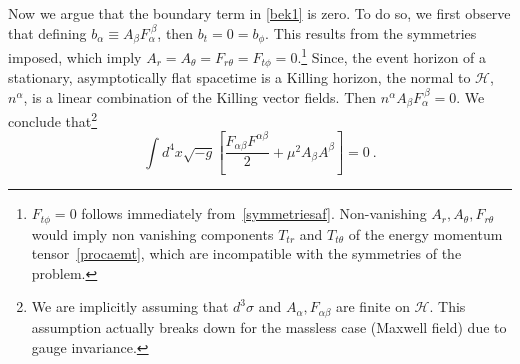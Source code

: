 Now we argue that the boundary term in  \eqref{bek1} is zero. To do so, we first observe that defining $b_\alpha\equiv A_\beta F_{\alpha}^{\ \beta}$, then $b_t=0=b_\phi$. This results from the symmetries imposed, which imply $A_r=A_\theta=F_{r\theta}=F_{t\phi}=0$.\footnote{$F_{t\phi}=0$ follows immediately from~\eqref{symmetriesaf}. Non-vanishing $A_r,A_\theta,F_{r\theta}$ would imply non vanishing components $T_{tr}$ and $T_{t\theta}$ of the energy momentum tensor~\eqref{procaemt}, which are incompatible with the symmetries of the problem.} 
Since, the event horizon of a stationary, asymptotically flat spacetime is a Killing horizon, the normal to $\mathcal{H}$, $n^\alpha$, 
is a linear combination of the Killing vector fields. Then $n^\alpha A_\beta F_{\alpha}^{\ \beta}=0$. 
%
We conclude that\footnote{We are implicitly assuming that $d^3\sigma$ and $A_\alpha,F_{\alpha\beta}$ are finite on $\mathcal{H}$. This assumption actually breaks down for the massless case (Maxwell field) due to gauge invariance.}
\begin{equation}
\int d^4x\sqrt{-g}\left[\frac{F_{\alpha\beta} F^{\alpha\beta}}{2}+\mu^2 A_\beta A^\beta\right]=0 \ .
\label{bek3}
\end{equation}

